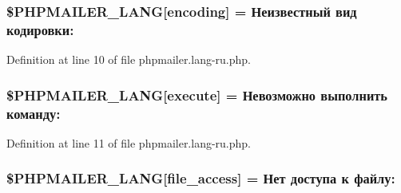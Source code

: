 \subsubsection[{\texorpdfstring{\$\+P\+H\+P\+M\+A\+I\+L\+E\+R\+\_\+\+L\+A\+NG}{$PHPMAILER_LANG}}]{\setlength{\rightskip}{0pt plus 5cm}\$P\+H\+P\+M\+A\+I\+L\+E\+R\+\_\+\+L\+A\+NG\mbox{[}\textquotesingle{}encoding\textquotesingle{}\mbox{]} = \textquotesingle{}Неизвестный вид кодировки\+: \textquotesingle{}}\hypertarget{phpmailer_8lang-ru_8php_a817f7283f3d54c970a0c10305cc668cc}{}\label{phpmailer_8lang-ru_8php_a817f7283f3d54c970a0c10305cc668cc}


Definition at line 10 of file phpmailer.\+lang-\/ru.\+php.

\subsubsection[{\texorpdfstring{\$\+P\+H\+P\+M\+A\+I\+L\+E\+R\+\_\+\+L\+A\+NG}{$PHPMAILER_LANG}}]{\setlength{\rightskip}{0pt plus 5cm}\$P\+H\+P\+M\+A\+I\+L\+E\+R\+\_\+\+L\+A\+NG\mbox{[}\textquotesingle{}execute\textquotesingle{}\mbox{]} = \textquotesingle{}Невозможно выполнить команду\+: \textquotesingle{}}\hypertarget{phpmailer_8lang-ru_8php_a668217a9563a168f30f2a8548b6ed5a9}{}\label{phpmailer_8lang-ru_8php_a668217a9563a168f30f2a8548b6ed5a9}


Definition at line 11 of file phpmailer.\+lang-\/ru.\+php.

\subsubsection[{\texorpdfstring{\$\+P\+H\+P\+M\+A\+I\+L\+E\+R\+\_\+\+L\+A\+NG}{$PHPMAILER_LANG}}]{\setlength{\rightskip}{0pt plus 5cm}\$P\+H\+P\+M\+A\+I\+L\+E\+R\+\_\+\+L\+A\+NG\mbox{[}\textquotesingle{}file\+\_\+access\textquotesingle{}\mbox{]} = \textquotesingle{}Нет доступа к файлу\+: \textquotesingle{}}\hypertarget{phpmailer_8lang-ru_8php_a7e83349023b856ef9e5c46e30ae6d51e}{}\label{phpmailer_8lang-ru_8php_a7e83349023b856ef9e5c46e30ae6d51e}



